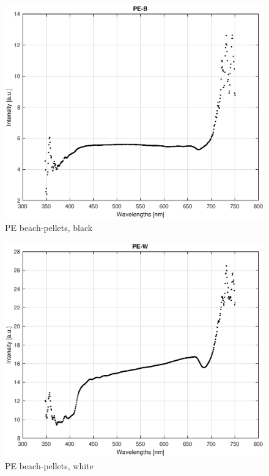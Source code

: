 \begin{appendices}
\begin{figure}
    \centering
    \includegraphics[width = 12cm]{Images/appendix/pe-beach-black.eps}
    \caption{PE beach-pellets, black}
    \label{fig:pe_beach_b}
\end{figure}

\begin{figure}
    \centering
    \includegraphics[width = 12cm]{Images/appendix/pe-beach-white.eps}
    \caption{PE beach-pellets, white}
    \label{fig:pe_beach_w}
\end{figure}


\end{appendices}
